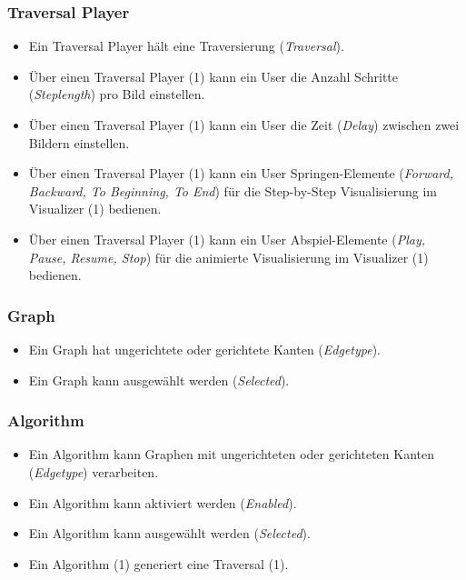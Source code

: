 \subsubsection{Traversal Player}
\label{subsubsec:Traversal Player}
\begin{itemize}
  \item Ein Traversal Player h\"alt eine Traversierung (\textit{Traversal}).
  \item \"Uber einen Traversal Player (1) kann ein User die Anzahl Schritte (\textit{Steplength}) pro Bild einstellen.
  \item \"Uber einen Traversal Player (1) kann ein User die Zeit (\textit{Delay}) zwischen zwei Bildern einstellen.
  \item \"Uber einen Traversal Player (1) kann ein User Springen-Elemente (\textit{Forward, Backward, To Beginning, To End}) f\"ur die Step-by-Step Visualisierung im Visualizer (1) bedienen.
  \item \"Uber einen Traversal Player (1) kann ein User Abspiel-Elemente (\textit{Play, Pause, Resume, Stop}) f\"ur die animierte Visualisierung im Visualizer (1) bedienen.
\end{itemize}

\subsubsection{Graph}
\label{subsubsec:Graph}
\begin{itemize}
  \item Ein Graph hat ungerichtete oder gerichtete Kanten (\textit{Edgetype}).
  \item Ein Graph kann ausgew\"ahlt werden (\textit{Selected}).
\end{itemize}

\subsubsection{Algorithm}
\label{subsubsec:Algorithm}
\begin{itemize}
  \item Ein Algorithm kann Graphen mit ungerichteten oder gerichteten Kanten (\textit{Edgetype}) verarbeiten.
  \item Ein Algorithm kann aktiviert werden (\textit{Enabled}).
  \item Ein Algorithm kann ausgew\"ahlt werden (\textit{Selected}).
  \item Ein Algorithm (1) generiert eine Traversal (1).
\end{itemize}

